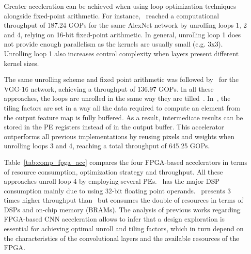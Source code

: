Greater acceleration can be achieved when using loop optimization techniques alongside fixed-point arithmetic. For instance,~\cite{suda:fpga_acc} reached a computational throughput of 187.24 GOPs for the same AlexNet network by unrolling loops 1, 2 and 4, relying on 16-bit fixed-point arithmetic. In general, unrolling loop 1 does not provide enough parallelism as the kernels are usually small (e.g. 3x3). Unrolling loop 1 also increases control complexity when layers present different kernel sizes. 
 
The same unrolling scheme and fixed point arithmetic was followed by~\cite{qiu:fpga_acc} for the VGG-16 network, achieving a throughput of 136.97 GOPs. In all these approaches, the loops are unrolled in the same way they are tilled~\cite{Abdelouahab:dnn_survey}. In~\cite{ma:loop_opt}, the tiling factors are set in a way all the data required to compute an element from the output feature map is fully buffered. As a result, intermediate results can be stored in the PE registers instead of in the output buffer. This accelerator outperforms all previous implementations by reusing pixels and weights when unrolling loops 3 and 4, reaching a total throughput of 645.25 GOPs.  

Table~\ref{tab:comp_fpga_acc} compares the four FPGA-based accelerators in terms of resource consumption, optimization strategy and throughput. All these approaches unroll loop 4 by employing several PEs.~\cite{zhang:fpga_acc} has the major DSP consumption mainly due to using 32-bit floating point operands.~\cite{ma:loop_opt} presents 3 times higher throughput than~\cite{qiu:fpga_acc} but consumes the double of resources in terms of DSPs and on-chip memory (BRAMs). The analysis of previous works regarding FPGA-based CNN acceleration allows to infer that a design exploration is essential for achieving optimal unroll and tiling factors, which in turn depend on the characteristics of the convolutional layers and the available resources of the FPGA. 

